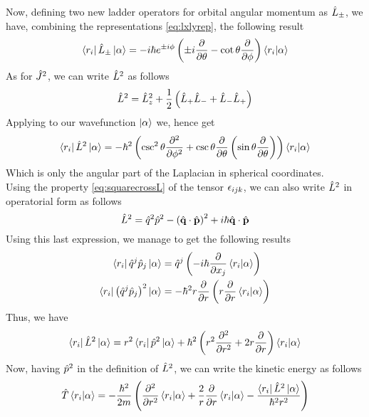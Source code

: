 \documentclass[../qm.tex]{subfiles}
\begin{document}
	Now, defining two new ladder operators for orbital angular momentum as $\hat{L}_{\pm}$, we have, combining the representations \eqref{eq:lxlyrep}, the following result
	\begin{equation}
		\bra{r_i}\hat{L}_{\pm}\ket{\alpha}=-i\hbar e^{\pm i\phi}\left( \pm i\pdv{\theta}-\cot\theta\pdv{\phi} \right)\bra{r_i}\ket{\alpha}
		\label{eq:orbangmomladopr}
	\end{equation}
	As for $\hat{J}^2$, we can write $\hat{L}^2$ as follows
	\begin{equation}
		\hat{L}^2=\hat{L}^2_z+\frac{1}{2}\left( \hat{L}_{+}\hat{L}_{-}+\hat{L}_{-}\hat{L}_{+} \right)
		\label{eq:lsqlplm}
	\end{equation}
	Applying to our wavefunction $\ket{\alpha}$ we, hence get
	\begin{equation}
		\bra{r_i}\hat{L}^2\ket{\alpha}=-\hbar^2\left( \csc^2\theta\pdv[2]{\phi}+\csc\theta\pdv{\theta}\left( \sin\theta\pdv{\theta} \right) \right)\bra{r_i}\ket{\alpha}
		\label{eq:lsqwf}
	\end{equation}
	Which is only the angular part of the Laplacian in spherical coordinates.\\
	Using the property \eqref{eq:squarecrossL} of the tensor $\epsilon_{ijk}$, we can also write $\hat{L}^2$ in operatorial form as follows
	\begin{equation}
		\hat{L}^2=\hat{q}^2\hat{p}^2-\left( \hat{\mathbf{q}}\cdot\hat{\mathbf{p}} \right)^2+i\hbar\hat{\mathbf{q}}\cdot\hat{\mathbf{p}}
		\label{eq:lsqopform}
	\end{equation}
	Using this last expression, we manage to get the following results
	\begin{equation*}
		\begin{aligned}
			\bra{r_i}\hat{q}^j\hat{p}_j\ket{\alpha}&=\hat{q}^j\left( -i\hbar\pdv{x_j}\bra{r_i}\ket{\alpha} \right)\\
			\bra{r_i}\left( \hat{q}^j\hat{p}_j \right)^2\ket{\alpha}&=-\hbar^2r\pdv{r}\left( r\pdv{r}\bra{r_i}\ket{\alpha} \right)
		\end{aligned}
	\end{equation*}
	Thus, we have
	\begin{equation}
		\bra{r_i}\hat{L}^2\ket{\alpha}=r^2\bra{r_i}\hat{p}^2\ket{\alpha}+\hbar^2\left( r^2\pdv[2]{r}+2r\pdv{r} \right)\bra{r_i}\ket{\alpha}
		\label{eq:lsqcomplete}
	\end{equation}
	Now, having $\hat{p}^2$ in the definition of $\hat{L}^2$, we can write the kinetic energy as follows
	\begin{equation}
		\hat{T}\bra{r_i}\ket{\alpha}=-\frac{\hbar^2}{2m}\left( \pdv[2]{r}\bra{r_i}\ket{\alpha}+\frac{2}{r}\pdv{r}\bra{r_i}\ket{\alpha}-\frac{\bra{r_i}\hat{L}^2\ket{\alpha}}{\hbar^2r^2} \right)
		\label{eq:kinenergyl2}
	\end{equation}
\end{document}
